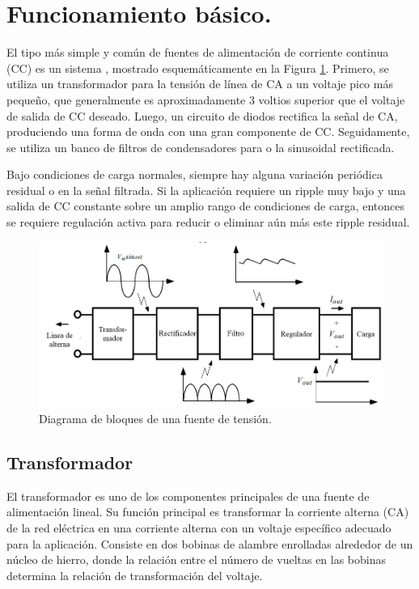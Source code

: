 \section{Funcionamiento básico.} \par 
El tipo más simple y común de fuentes de alimentación de corriente continua (CC) es un sistema  , mostrado esquemáticamente en la Figura \ref{F:componentesFL}. Primero, se utiliza un transformador para  la tensión de línea de CA a un voltaje pico más pequeño, que generalmente es aproximadamente 3 voltios superior que el voltaje de salida de CC deseado. Luego, un circuito de diodos rectifica la señal de CA, produciendo una forma de onda con una gran componente de CC. Seguidamente, se utiliza un banco de filtros de condensadores para  o  la sinusoidal rectificada. \par 
Bajo condiciones de carga normales, siempre hay alguna variación periódica residual o  en la señal filtrada. Si la aplicación requiere un ripple muy bajo y una salida de CC constante sobre un amplio rango de condiciones de carga, entonces se requiere regulación activa para reducir o eliminar aún más este ripple residual. \cite{tektronix_pws4305}
\begin{figure}
    \centering
    \includegraphics[scale=0.5]{./imagenes/componentesFL.jpg}
    \caption{Diagrama de bloques de una fuente de tensión.}
    \label{F:componentesFL}
\end{figure}

\subsection{Transformador}\par 
El transformador es uno de los componentes principales de una fuente de alimentación lineal. Su función principal es transformar la corriente alterna (CA) de la red eléctrica en una corriente alterna con un voltaje específico adecuado para la aplicación. Consiste en dos bobinas de alambre enrolladas alrededor de un núcleo de hierro, donde la relación entre el número de vueltas en las bobinas determina la relación de transformación del voltaje.

